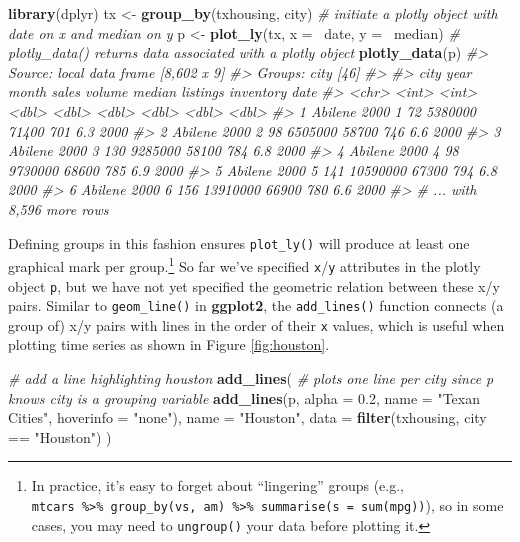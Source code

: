 \documentclass[12pt,]{isuthesis}
\newenvironment{Shaded}{\begin{snugshade}}{\end{snugshade}}
\newcommand{\KeywordTok}[1]{\textcolor[rgb]{0.13,0.29,0.53}{\textbf{{#1}}}}
\newcommand{\DataTypeTok}[1]{\textcolor[rgb]{0.13,0.29,0.53}{{#1}}}
\newcommand{\FloatTok}[1]{\textcolor[rgb]{0.00,0.00,0.81}{{#1}}}
\newcommand{\StringTok}[1]{\textcolor[rgb]{0.31,0.60,0.02}{{#1}}}
\newcommand{\CommentTok}[1]{\textcolor[rgb]{0.56,0.35,0.01}{\textit{{#1}}}}
\newcommand{\NormalTok}[1]{{#1}}
\let\rmarkdownfootnote\footnote%
\def\footnote{\protect\rmarkdownfootnote}
\begin{document}
\begin{Shaded}
\begin{Highlighting}[]
\KeywordTok{library}\NormalTok{(dplyr)}
\NormalTok{tx <-}\StringTok{ }\KeywordTok{group_by}\NormalTok{(txhousing, city)}
\CommentTok{# initiate a plotly object with date on x and median on y}
\NormalTok{p <-}\StringTok{ }\KeywordTok{plot_ly}\NormalTok{(tx, }\DataTypeTok{x =} \NormalTok{~date, }\DataTypeTok{y =} \NormalTok{~median)}
\CommentTok{# plotly_data() returns data associated with a plotly object}
\KeywordTok{plotly_data}\NormalTok{(p)}
\CommentTok{#> Source: local data frame [8,602 x 9]}
\CommentTok{#> Groups: city [46]}
\CommentTok{#> }
\CommentTok{#>      city  year month sales   volume median listings inventory  date}
\CommentTok{#>     <chr> <int> <int> <dbl>    <dbl>  <dbl>    <dbl>     <dbl> <dbl>}
\CommentTok{#> 1 Abilene  2000     1    72  5380000  71400      701       6.3  2000}
\CommentTok{#> 2 Abilene  2000     2    98  6505000  58700      746       6.6  2000}
\CommentTok{#> 3 Abilene  2000     3   130  9285000  58100      784       6.8  2000}
\CommentTok{#> 4 Abilene  2000     4    98  9730000  68600      785       6.9  2000}
\CommentTok{#> 5 Abilene  2000     5   141 10590000  67300      794       6.8  2000}
\CommentTok{#> 6 Abilene  2000     6   156 13910000  66900      780       6.6  2000}
\CommentTok{#> # ... with 8,596 more rows}
\end{Highlighting}
\end{Shaded}

Defining groups in this fashion ensures \texttt{plot\_ly()} will produce
at least one graphical mark per group.\footnote{In practice, it's easy
  to forget about ``lingering'' groups (e.g.,
  \texttt{mtcars\ \%\textgreater{}\%\ group\_by(vs,\ am)\ \%\textgreater{}\%\ summarise(s\ =\ sum(mpg))}),
  so in some cases, you may need to \texttt{ungroup()} your data before
  plotting it.} So far we've specified \texttt{x}/\texttt{y} attributes
in the plotly object \texttt{p}, but we have not yet specified the
geometric relation between these x/y pairs. Similar to
\texttt{geom\_line()} in \textbf{ggplot2}, the \texttt{add\_lines()}
function connects (a group of) x/y pairs with lines in the order of
their \texttt{x} values, which is useful when plotting time series as
shown in Figure \ref{fig:houston}.

\begin{Shaded}
\begin{Highlighting}[]
\CommentTok{# add a line highlighting houston}
\KeywordTok{add_lines}\NormalTok{(}
  \CommentTok{# plots one line per city since p knows city is a grouping variable}
  \KeywordTok{add_lines}\NormalTok{(p, }\DataTypeTok{alpha =} \FloatTok{0.2}\NormalTok{, }\DataTypeTok{name =} \StringTok{"Texan Cities"}\NormalTok{, }\DataTypeTok{hoverinfo =} \StringTok{"none"}\NormalTok{),}
  \DataTypeTok{name =} \StringTok{"Houston"}\NormalTok{, }\DataTypeTok{data =} \KeywordTok{filter}\NormalTok{(txhousing, city ==}\StringTok{ "Houston"}\NormalTok{)}
\NormalTok{)}
\end{Highlighting}
\end{Shaded}
\end{document}
